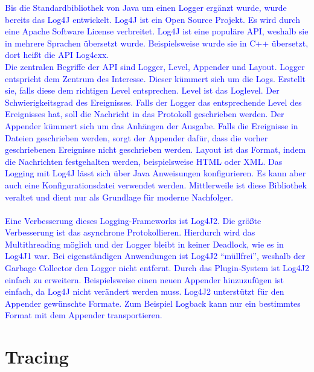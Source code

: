\textcolor{blue}{
    Bis die Standardbibliothek von Java um einen Logger ergänzt wurde, wurde bereits das Log4J entwickelt.
    Log4J ist ein Open Source Projekt.
    Es wird durch eine Apache Software License verbreitet.
    Log4J ist eine populäre API, weshalb sie in mehrere Sprachen übersetzt wurde.
    Beispielsweise wurde sie in C++ übersetzt, dort heißt die API Log4cxx.
    \\
    Die zentralen Begriffe der API sind Logger, Level, Appender und Layout.
    Logger entspricht dem Zentrum des Interesse.
    Dieser kümmert sich um die Logs.
    Erstellt sie, falls diese dem richtigen Level entsprechen.
    Level ist das Loglevel.
    Der Schwierigkeitsgrad des Ereignisses.
    Falls der Logger das entsprechende Level des Ereignisses hat, soll die Nachricht in das Protokoll geschrieben werden.
    Der Appender kümmert sich um das Anhängen der Ausgabe.
    Falls die Ereignisse in Dateien geschrieben werden, sorgt der Appender dafür, dass die vorher geschriebenen Ereignisse nicht geschrieben werden.
    Layout ist das Format, indem die Nachrichten festgehalten werden, beispielsweise HTML oder XML.
    Das Logging mit Log4J lässt sich über Java Anweisungen konfigurieren.
    Es kann aber auch eine Konfigurationsdatei verwendet werden.
    Mittlerweile ist diese Bibliothek veraltet und dient nur als Grundlage für moderne Nachfolger.
    \\
    \\
    Eine Verbesserung dieses Logging-Frameworks ist Log4J2.
    Die größte Verbesserung ist das asynchrone Protokollieren.
    Hierdurch wird das Multithreading möglich und der Logger bleibt in keiner Deadlock, wie es in Log4J1 war.
    Bei eigenständigen Anwendungen ist Log4J2 \enquote{müllfrei}, weshalb der Garbage Collector den Logger nicht entfernt.
    Durch das Plugin-System ist Log4J2 einfach zu erweitern.
    Beispielsweise einen neuen Appender hinzuzufügen ist einfach, da Log4J nicht verändert werden muss.
    Log4J2 unterstützt für den Appender gewünschte Formate.
    Zum Beispiel Logback kann nur ein bestimmtes Format mit dem Appender transportieren.
}\autocite{rheinwerk, baeldung, log4j2}


\section{Tracing}\label{sec:tracing-verfahren}



